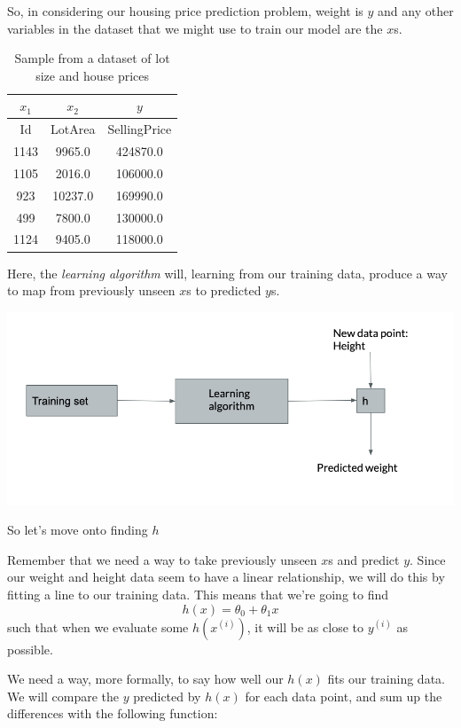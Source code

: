 \documentclass[12pt]{article}
\begin{document}
So, in considering our housing price prediction problem, weight is $y$ and any other variables in the dataset that we might use to train our model are the $x$s.

\begin{table}[htp]
\caption{Sample from a dataset of lot size and house prices}
\begin{center}
\begin{tabular}{|c|c|c|}
\hline
$x_1$ & $x_2$ & $y$ \\ \hline
Id & LotArea & SellingPrice  \\ \hline
1143 & 9965.0 & 424870.0 \\
1105 & 2016.0 & 106000.0 \\
923 & 10237.0 & 169990.0 \\
499& 7800.0 & 130000.0 \\
1124 & 9405.0 & 118000.0 \\
\hline
\end{tabular}
\end{center}
\label{table:house-prices-sample-table-xs}
\end{table}%

Here, the \textit{learning algorithm} will, learning from our training data, produce a way to map from previously unseen $x$s to predicted $y$s.


\includegraphics[width={\textwidth}]{the-model}


So let's move onto finding $h$

Remember that we need a way to take previously unseen $x$s and predict $y$. Since our weight and height data seem to have a linear relationship, we will do this by fitting a line to our training data. This means that we're going to find \[h(x) = \theta_0 + \theta_1x\] such that when we evaluate some $h(x^{(i)})$, it will be as close to $y^{(i)}$ as possible.

We need a way, more formally, to say how well our $h(x)$ fits our training data. We will compare the $y$ predicted by $h(x)$ for each data point, and sum up the differences with the following function:
\end{document}
